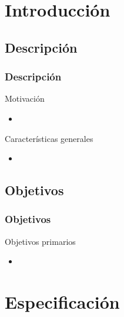 \section{Introducción} 

\subsection{Descripción}

\begin{frame}
	\frametitle{Descripción}
	
		\begin{block}{Motivación}
			\begin{itemize}
				\item
			\end{itemize}
		\end{block}

		\begin{block}{Características generales}
			\begin{itemize}
				\item
			\end{itemize}
		\end{block}

\end{frame}

\subsection{Objetivos}
\begin{frame}
	\frametitle{Objetivos}
	\begin{block}{Objetivos primarios}
		\begin{itemize}
			\item 
		\end{itemize}
	\end{block}
\end{frame}

\section{Especificación}


